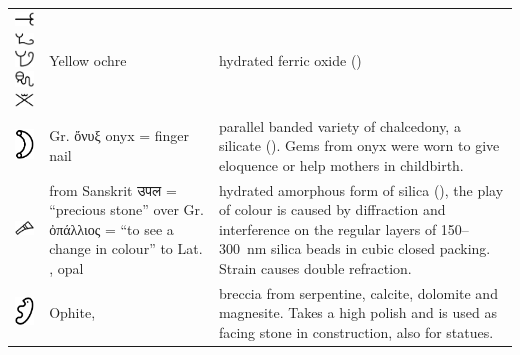 \documentclass[british,final,landscape]{scrartcl}
\begin{document}
\begin{refsection}
\begin{supertabular}{p{0.3\textwidth}p{0.34\textwidth}p{0.34\textwidth}}
   \includegraphics[width=5mm]{Mineral/YellowOchre} \includegraphics[width=5mm]{Mineral/YellowOchre2} \includegraphics[width=5mm]{Mineral/YellowOchre3} \includegraphics[width=5mm]{Mineral/YellowOchre4} \includegraphics[width=5mm]{Mineral/YellowOchre5} & Yellow ochre & hydrated ferric oxide ()\\
   \includegraphics[width=5mm]{Mineral/Onyx} & Gr. \foreignlanguage{greek}{ὄνυξ} onyx = finger nail & parallel banded variety of chalcedony, a silicate (). Gems from onyx were worn to give eloquence or help mothers in childbirth. \\
   \includegraphics[width=5mm]{Mineral/Opal} & from Sanskrit \foreignlanguage{sanskrit}{उपल}  = ``precious stone'' over Gr. \foreignlanguage{greek}{ὀπάλλιος}  = ``to see a change in colour'' to Lat. , opal &  hydrated amorphous form of silica (), the play of colour is caused by diffraction and interference on the regular layers of \num{150}--\SI{300}{nm} silica beads in cubic closed packing. Strain causes double refraction.  \\
   \includegraphics[width=5mm]{Mineral/Ophite} & Ophite,  & breccia from serpentine, calcite, dolomite and magnesite. Takes a high polish and is used as facing stone in construction, also for statues. \\

\end{supertabular}
\end{refsection}
\end{document}
